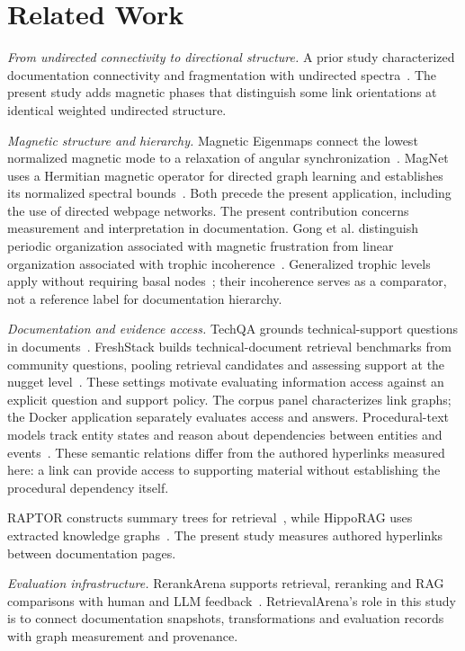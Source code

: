\section{Related Work}
\label{sec:related-work}
\textit{From undirected connectivity to directional structure.}
A prior study characterized documentation connectivity and fragmentation
with undirected spectra~\cite{11476418}. The present study adds magnetic phases
that distinguish some link orientations at identical weighted undirected structure.

\textit{Magnetic structure and hierarchy.}
Magnetic Eigenmaps connect the lowest normalized magnetic mode to a relaxation
of angular synchronization~\cite{fanuel2018}. MagNet uses a Hermitian magnetic
operator for directed graph learning and establishes its normalized spectral
bounds~\cite{magnet2021}. Both precede the present application, including the use
of directed webpage networks. The present contribution concerns measurement and
interpretation in documentation. Gong et al. distinguish periodic organization
associated with magnetic frustration from linear organization associated with
trophic incoherence~\cite{gong2021}. Generalized trophic levels apply without
requiring basal nodes~\cite{mackay2020}; their incoherence serves as a comparator,
not a reference label for documentation hierarchy.

\textit{Documentation and evidence access.}
TechQA grounds technical-support questions in documents~\cite{techqa2020}.
FreshStack builds technical-document retrieval benchmarks from community
questions, pooling retrieval candidates and assessing support at the nugget
level~\cite{freshstack2025}. These settings motivate evaluating information access
against an explicit question and support policy. The corpus panel characterizes
link graphs; the Docker application separately evaluates access and answers.
Procedural-text models track entity states and reason about dependencies between
entities and events~\cite{tang2020ien,zhang2023crepe}. These semantic relations
differ from the authored hyperlinks measured here: a link can provide access to
supporting material without establishing the procedural dependency itself.

RAPTOR constructs summary trees for retrieval~\cite{raptor2024}, while HippoRAG
uses extracted knowledge graphs~\cite{hipporag2024}. The present study measures authored
hyperlinks between documentation pages.

\textit{Evaluation infrastructure.}
RerankArena supports retrieval, reranking and RAG comparisons with human and LLM
feedback~\cite{abdallah2025rerankarena}. RetrievalArena's role in this study is to
connect documentation snapshots, transformations and evaluation records with
graph measurement and provenance.

